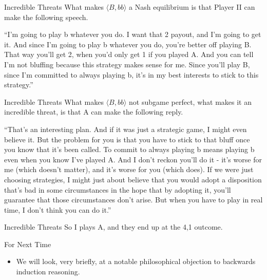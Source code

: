 \documentclass[
  ignorenonframetext,
]{beamer}
\providecommand{\tightlist}{%
  \setlength{\itemsep}{0pt}\setlength{\parskip}{0pt}}
\renewenvironment*{quote}	
	{\list{}{\rightmargin   \leftmargin} \item } 	
	{\endlist }
\begin{document}
\begin{frame}{Incredible Threats}
\protect\hypertarget{incredible-threats}{}
What makes \(\langle B, bb \rangle\) a Nash equilibrium is that Player
II can make the following speech.

\begin{quote}
``I'm going to play b whatever you do. I want that 2 payout, and I'm
going to get it. And since I'm going to play b whatever you do, you're
better off playing B. That way you'll get 2, when you'd only get 1 if
you played A. And you can tell I'm not bluffing because this strategy
makes sense for me. Since you'll play B, since I'm committed to always
playing b, it's in my best interests to stick to this strategy.''
\end{quote}
\end{frame}

\begin{frame}{Incredible Threats}
\protect\hypertarget{incredible-threats-1}{}
What makes \(\langle B, bb \rangle\) not subgame perfect, what makes it
an incredible threat, is that A can make the following reply.
\end{frame}

\begin{frame}
\begin{quote}
``That's an interesting plan. And if it was just a strategic game, I
might even believe it. But the problem for you is that you have to stick
to that bluff once you know that it's been called. To commit to always
playing b means playing b even when you know I've played A. And I don't
reckon you'll do it - it's worse for me (which doesn't matter), and it's
worse for you (which does). If we were just choosing strategies, I might
just about believe that you would adopt a disposition that's bad in some
circumstances in the hope that by adopting it, you'll guarantee that
those circumstances don't arise. But when you have to play in real time,
I don't think you can do it.''
\end{quote}
\end{frame}

\begin{frame}{Incredible Threats}
\protect\hypertarget{incredible-threats-2}{}
So I plays A, and they end up at the 4,1 outcome.
\end{frame}

\begin{frame}{For Next Time}
\protect\hypertarget{for-next-time}{}
\begin{itemize}
\tightlist
\item
  We will look, very briefly, at a notable philosophical objection to
  backwards induction reasoning.
\end{itemize}
\end{frame}
\end{document}
